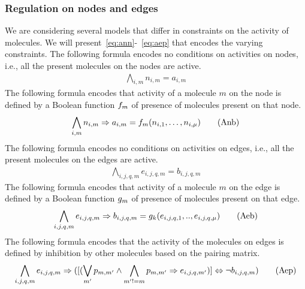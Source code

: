 \subsubsection{Regulation on nodes and edges}
We are considering several models that differ in constraints on
the activity of molecules.
%
We will present~\eqref{eq:ann}-~\eqref{eq:aep} that encodes
the varying constraints.
%
The following formula encodes no conditions on activities on nodes,
i.e., all the present molecules on the nodes are active.
\begin{align}
\bigwedge\limits_{i,m} n_{i,m} = a_{i,m}    \tag{Ann}\label{eq:ann}
\end{align}
The following formula encodes that activity of a molecule $m$ on the node is
defined by a Boolean function $f_m$ of presence of molecules present on that node.
\begin{align}
\bigwedge\limits_{i,m} n_{i,m} \Rightarrow a_{i,m} =  f_m (n_{i,1},\dots,n_{i,\mu}) 
\tag{Anb}\label{eq:anb}
\end{align}
The following formula encodes no conditions on activities on edges,
i.e., all the present molecules on the edges are active.
\begin{align}
  \bigwedge\limits_{i,j,q,m} e_{i,j,q,m} = b_{i,j,q,m}
\tag{Aen}\label{eq:aen}
\end{align}
The following formula encodes that activity of a molecule $m$ on the edge is
defined by a Boolean function $g_m$ of presence of molecules present on that edge.
\begin{align}
   \bigwedge\limits_{i,j,q,m} e_{i,j,q,m} \Rightarrow b_{i,j,q,m} = g_k(e_{i,j,q,1}, .., e_{i,j,q,\mu} )
  \tag{Aeb}\label{eq:aeb}
\end{align}
%
The following formula encodes that the activity of the molecules on
edges is defined by inhibition by other molecules based on the pairing
matrix. 
\begin{align}
   \bigwedge\limits_{i,j,q, m}  e_{i,j,q,m} \Rightarrow(  [ ( \bigvee_{m'} p_{m,m'} \land \bigwedge_{m' != m} p_{m,m'} \Rightarrow e_{i,j,q,m'})] \Leftrightarrow \neg b_{i,j,q,m})
  \tag{Aep}\label{eq:aep}
\end{align}



